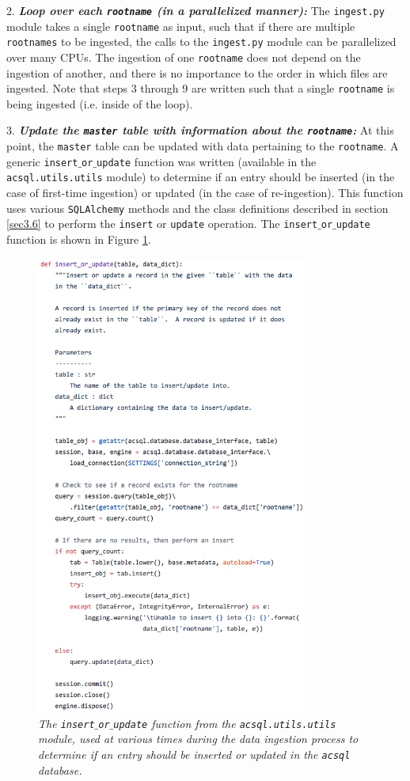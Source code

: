 \documentclass[10pt,journal,compsoc]{IEEEtran}
\begin{document}
2. \textbf{\textit{Loop over each \texttt{rootname} (in a parallelized manner):}}  The \texttt{ingest.py} module takes a single \texttt{rootname} as input, such that if there are multiple
\texttt{rootnames} to be ingested, the calls to the \texttt{ingest.py} module can be parallelized over many CPUs.  The ingestion of one \texttt{rootname} does not depend on the ingestion of
another, and there is no importance to the order in which files are ingested.  Note that steps 3 through 9 are written such that a single \texttt{rootname} is being
ingested (i.e. inside of the loop).

3. \textbf{\textit{Update the \texttt{master} table with information about the \texttt{rootname}:}} At this point, the \texttt{master} table can be updated with data pertaining to the
\texttt{rootname}.  A generic \texttt{insert$\_$or$\_$update} function was written (available in the \texttt{acsql.utils.utils} module) to determine if an entry should be inserted (in the
case of first-time ingestion) or updated (in the case of re-ingestion). This function uses various \texttt{SQLAlchemy} methods and the class definitions described
in section \ref{sec3.6} to perform the \texttt{insert} or \texttt{update} operation.  The \texttt{insert$\_$or$\_$update} function is shown in Figure \ref{fig19}.

\begin{figure}[!t]
\centering
\includegraphics[width=3.5in]{./figures/insert_or_update.png}
\caption{\textit{The \texttt{insert$\_$or$\_$update} function from the \texttt{acsql.utils.utils} module, used at various times during the data ingestion process to determine if an
entry should be inserted or updated in the \texttt{acsql} database.}}
\label{fig19}
\end{figure}
\end{document}
